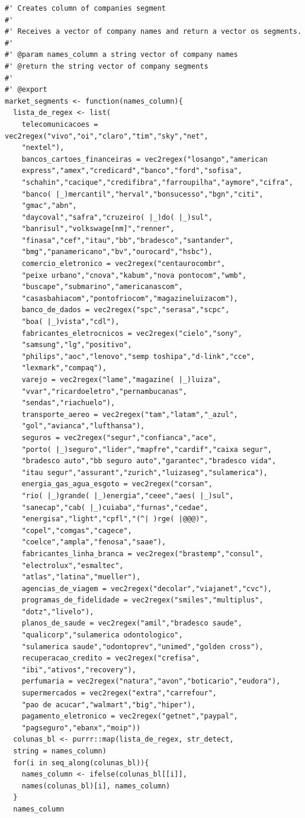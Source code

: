 \documentclass[]{report}
\begin{document}
\begin{verbatim}
#' Creates column of companies segment
#'
#' Receives a vector of company names and return a vector os segments.
#'
#' @param names_column a string vector of company names
#' @return the string vector of company segments
#'
#' @export
market_segments <- function(names_column){
  lista_de_regex <- list(
    telecomunicacoes = vec2regex("vivo","oi","claro","tim","sky","net",
    "nextel"),
    bancos_cartoes_financeiras = vec2regex("losango","american
    express","amex","credicard","banco","ford","sofisa",
    "schahin","cacique","credifibra","farroupilha","aymore","cifra",
    "banco( |_)mercantil","herval","bonsucesso","bgn","citi",
    "gmac","abn",
    "daycoval","safra","cruzeiro( |_)do( |_)sul",
    "banrisul","volkswage[nm]","renner",
    "finasa","cef","itau","bb","bradesco","santander",
    "bmg","panamericano","bv","ourocard","hsbc"),
    comercio_eletronico = vec2regex("centaurocombr",
    "peixe urbano","cnova","kabum","nova pontocom","wmb",
    "buscape","submarino","americanascom",
    "casasbahiacom","pontofriocom","magazineluizacom"),
    banco_de_dados = vec2regex("spc","serasa","scpc",
    "boa( |_)vista","cdl"),
    fabricantes_eletrocnicos = vec2regex("cielo","sony",
    "samsung","lg","positivo",
    "philips","aoc","lenovo","semp toshipa","d-link","cce",
    "lexmark","compaq"),
    varejo = vec2regex("lame","magazine( |_)luiza",
    "vvar","ricardoeletro","pernambucanas",
    "sendas","riachuelo"),
    transporte_aereo = vec2regex("tam","latam","_azul",
    "gol","avianca","lufthansa"),
    seguros = vec2regex("segur","confianca","ace",
    "porto( |_)seguro","lider","mapfre","cardif","caixa segur",
    "bradesco auto","bb seguro auto","garantec","bradesco vida",
    "itau segur","assurant","zurich","luizaseg","sulamerica"),
    energia_gas_agua_esgoto = vec2regex("corsan",
    "rio( |_)grande( |_)energia","ceee","aes( |_)sul",
    "sanecap","cab( |_)cuiaba","furnas","cedae",
    "energisa","light","cpfl","(^| )rge( |@@@)",
    "copel","comgas","cagece",
    "coelce","ampla","fenosa","saae"),
    fabricantes_linha_branca = vec2regex("brastemp","consul",
    "electrolux","esmaltec",
    "atlas","latina","mueller"),
    agencias_de_viagem = vec2regex("decolar","viajanet","cvc"),
    programas_de_fidelidade = vec2regex("smiles","multiplus",
    "dotz","livelo"),
    planos_de_saude = vec2regex("amil","bradesco saude",
    "qualicorp","sulamerica odontologico",
    "sulamerica saude","odontoprev","unimed","golden cross"),
    recuperacao_credito = vec2regex("crefisa",
    "ibi","ativos","recovery"),
    perfumaria = vec2regex("natura","avon","boticario","eudora"),
    supermercados = vec2regex("extra","carrefour",
    "pao de acucar","walmart","big","hiper"),
    pagamento_eletronico = vec2regex("getnet","paypal",
    "pagseguro","ebanx","moip"))
  colunas_bl <- purrr::map(lista_de_regex, str_detect,
  string = names_column)
  for(i in seq_along(colunas_bl)){
    names_column <- ifelse(colunas_bl[[i]],
    names(colunas_bl)[i], names_column)
  }
  names_column

\end{verbatim}
\end{document}
